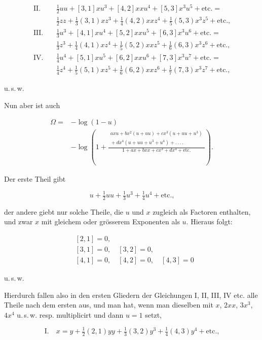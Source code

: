 \[
\begin{aligned}
\text{II.}\quad & \tfrac12 uu+[3,1]xu^3+[4,2]xxu^4+[5,3]x^3u^5+\text{etc.} = \\
& \tfrac12 zz+\tfrac13(3,1)xz^3+\tfrac14(4,2)xxz^4+\tfrac15(5,3)x^3z^5+\text{etc.,}\\[6pt]
\text{III.}\quad & \tfrac13 u^3+[4,1]xu^4+[5,2]xxu^5+[6,3]x^3u^6+\text{etc.} = \\
& \tfrac13 z^3+\tfrac14(4,1)xz^4+\tfrac15(5,2)xxz^5+\tfrac16(6,3)x^3z^6+\text{etc.,}\\[6pt]
\text{IV.}\quad & \tfrac14 u^4+[5,1]xu^5+[6,2]xxu^6+[7,3]x^3u^7+\text{etc.} = \\
& \tfrac14 z^4+\tfrac15(5,1)xz^5+\tfrac16(6,2)xxz^6+\tfrac17(7,3)x^3z^7+\text{etc.,}
\end{aligned}
\]

\noindent u.\,s.\,w.

Nun aber ist auch

\[
\begin{aligned}\Omega ={}& -\log(1-u)\\ &-\log\left(1+\frac{\begin{gathered}axu+bx^2(u+uu)+cx^3(u+uu+u^3)\\ {}+dx^4(u+uu+u^3+u^4)+.\,.\,.\,.\end{gathered}}{1+ax+bxx+cx^3+dx^4+\text{etc.}}\right).
\end{aligned}
\]

Der erste Theil gibt

\[
u+\tfrac12 uu+\tfrac13 u^3+\tfrac14 u^4+\text{etc.,}
\]

\noindent der andere giebt nur solche Theile, die $u$ und $x$ zugleich als Factoren enthalten, und zwar $x$ mit gleichem oder gr\"osserem Exponenten als $u$. Hieraus folgt:

\[
\begin{aligned}
& [2,1]=0,\\
& [3,1]=0,\quad [3,2]=0,\\
& [4,1]=0,\quad [4,2]=0,\quad [4,3]=0
\end{aligned}
\]

\noindent u.\,s.\,w.

Hierdurch fallen also in den ersten Gliedern der Gleichungen I, II, III, IV etc. alle Theile nach dem ersten aus, und man hat, wenn man dieselben mit $x$, $2xx$, $3x^3$, $4x^4$ u.\,s.\,w. resp. multiplicirt und dann $u=1$ setzt,

\[\text{I.}\quad x = y + \tfrac12(2,1)yy+\tfrac13(3,2)y^3+\tfrac14(4,3)y^4+\text{etc.,}\]

